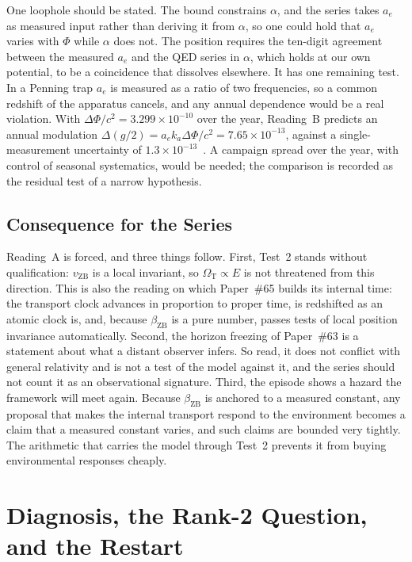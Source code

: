 \documentclass[%
 reprint, amsmath,amssymb, aps, prb, ]{revtex4-2}
\numberwithin{equation}{section}
\newcommand{\vZB}{v_{\text{ZB}}}
\newcommand{\betaZB}{\beta_{\text{ZB}}}
\newcommand{\OmT}{\Omega_{\text{T}}}
\begin{document}
One loophole should be stated. The bound constrains $\alpha$, and the series takes $a_e$ as measured input rather than deriving it from $\alpha$, so one could hold that $a_e$ varies with $\Phi$ while $\alpha$ does not. The position requires the ten-digit agreement between the measured $a_e$ and the QED series in $\alpha$, which holds at our own potential, to be a coincidence that dissolves elsewhere. It has one remaining test. In a Penning trap $a_e$ is measured as a ratio of two frequencies, so a common redshift of the apparatus cancels, and any annual dependence would be a real violation. With $\Delta\Phi/c^{2} = 3.299\times10^{-10}$ over the year, Reading~B predicts an annual modulation $\Delta(g/2) = a_e k_a\Delta\Phi/c^{2} = 7.65\times10^{-13}$, against a single-measurement uncertainty of $1.3\times10^{-13}$~\cite{fan2023}. A campaign spread over the year, with control of seasonal systematics, would be needed; the comparison is recorded as the residual test of a narrow hypothesis.

\subsection{Consequence for the Series}
\label{subsec:tension_consequence}

Reading~A is forced, and three things follow. First, Test~2 stands without qualification: $\vZB$ is a local invariant, so $\OmT \propto E$ is not threatened from this direction. This is also the reading on which Paper~\#65 builds its internal time: the transport clock advances in proportion to proper time, is redshifted as an atomic clock is, and, because $\betaZB$ is a pure number, passes tests of local position invariance automatically. Second, the horizon freezing of Paper~\#63 is a statement about what a distant observer infers. So read, it does not conflict with general relativity and is not a test of the model against it, and the series should not count it as an observational signature. Third, the episode shows a hazard the framework will meet again. Because $\betaZB$ is anchored to a measured constant, any proposal that makes the internal transport respond to the environment becomes a claim that a measured constant varies, and such claims are bounded very tightly. The arithmetic that carries the model through Test~2 prevents it from buying environmental responses cheaply.

\section{Diagnosis, the Rank-2 Question, and the Restart}
\label{sec:diagnosis}
\end{document}
